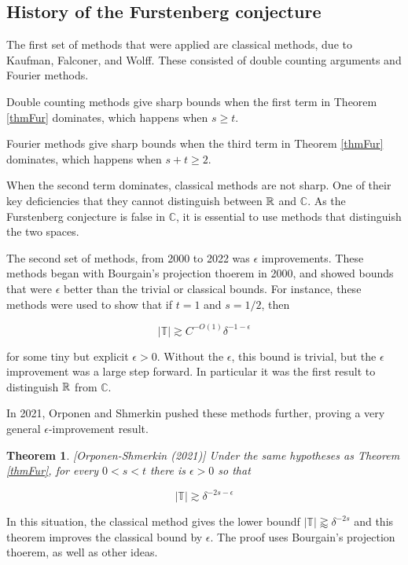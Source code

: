 \documentclass[12pt]{amsart}
\newtheorem{theorem}{Theorem}[section]
\newcommand{\CC}{\mathbb{C}}
\newcommand{\TT}{\mathbb{T}}
\begin{document}
\subsection{History of the Furstenberg conjecture}


The first set of methods that were applied are classical methods, due to Kaufman, Falconer, and Wolff. These consisted of double counting arguments and Fourier methods. 

Double counting methods give sharp bounds when the first term in Theorem \ref{thmFur} dominates,  which happens when $s \ge t$.

Fourier methods give sharp bounds when the third term in Theorem \ref{thmFur} dominates,  which happens when $s + t \ge 2$. 

When the second term dominates,  classical methods are not sharp.   One of their key deficiencies that they cannot distinguish between $\mathbb{R}$ and $\mathbb{C}$. As the Furstenberg conjecture is false in $\mathbb{C}$, it is essential to use methods that distinguish the two spaces. 

The second set of methods, from 2000 to 2022 was $\epsilon$ improvements. These methods began with Bourgain's projection thoerem in 2000, and showed bounds that were $\epsilon$ better than the trivial or classical bounds. For instance, these methods were used to show that if $t=1$ and $s= 1/2$, then 

$$|\mathbb{T}| \gtrsim C^{-O(1)} \delta^{-1-\epsilon} $$ 

\noindent for some tiny but explicit $\epsilon > 0$.    Without the $\epsilon$, this bound is trivial, but the $\epsilon$ improvement was a large step forward.   In particular it was the first result to distinguish $\mathbb{R}$ from $\CC$.

In 2021, Orponen and Shmerkin pushed these methods further,  proving a very general $\epsilon$-improvement result.

\begin{theorem} \label{thmOSeps} [Orponen-Shmerkin (2021)]
   Under the same hypotheses as Theorem \ref{thmFur},  for every $0 < s < t$ there is $\epsilon > 0$ so that 

    \begin{equation}
        |\mathbb{T}| \gtrsim \delta^{-2s - \epsilon}
    \end{equation} 
\end{theorem}

\noindent In this situation,  the classical method gives the lower boundf $|\TT| \gtrapprox \delta^{-2s}$ and this theorem improves the classical bound by $\epsilon$.    The proof uses Bourgain's projection thoerem, as well as other ideas.   
\end{document}

